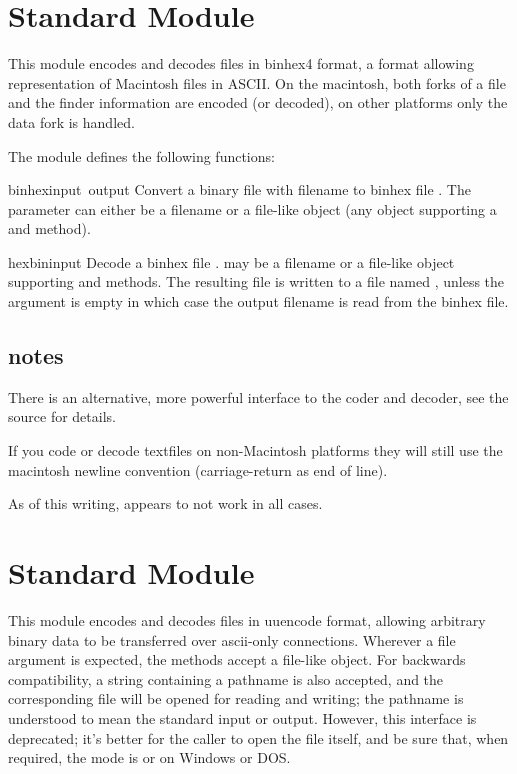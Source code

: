 \section{Standard Module }
\label{module-binhex}

This module encodes and decodes files in binhex4 format, a format
allowing representation of Macintosh files in ASCII. On the macintosh,
both forks of a file and the finder information are encoded (or
decoded), on other platforms only the data fork is handled.

The  module defines the following functions:


\begin{funcdesc}{binhex}{input\, output}
Convert a binary file with filename  to binhex file
. The  parameter can either be a filename or a
file-like object (any object supporting a  and 
method).
\end{funcdesc}

\begin{funcdesc}{hexbin}{input}
Decode a binhex file .  may be a filename or a
file-like object supporting  and  methods.
The resulting file is written to a file named , unless the
argument is empty in which case the output filename is read from the
binhex file.
\end{funcdesc}

\subsection{notes}
There is an alternative, more powerful interface to the coder and
decoder, see the source for details.

If you code or decode textfiles on non-Macintosh platforms they will
still use the macintosh newline convention (carriage-return as end of
line).

As of this writing,  appears to not work in all cases.

\section{Standard Module }

This module encodes and decodes files in uuencode format, allowing
arbitrary binary data to be transferred over ascii-only connections.
Wherever a file argument is expected, the methods accept a file-like
object.  For backwards compatibility, a string containing a pathname
is also accepted, and the corresponding file will be opened for
reading and writing; the pathname  is understood to mean the
standard input or output.  However, this interface is deprecated; it's
better for the caller to open the file itself, and be sure that, when
required, the mode is  or  on Windows or DOS.

